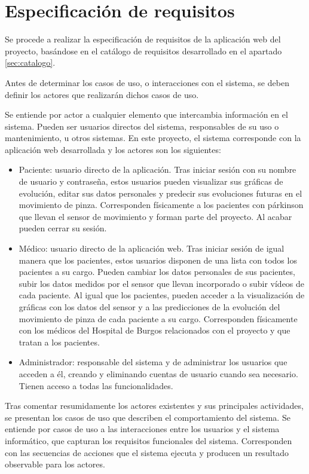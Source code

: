 \section{Especificación de requisitos}
Se procede a realizar la especificación de requisitos de la aplicación web del proyecto, basándose en el catálogo de requisitos desarrollado en el apartado \ref{sec:catalogo}.

Antes de determinar los casos de uso, o interacciones con el sistema, se deben definir los actores que realizarán dichos casos de uso.

Se entiende por actor a cualquier elemento que intercambia información en el sistema. Pueden ser usuarios directos del sistema, responsables de su uso o mantenimiento, u otros sistemas. 
En este proyecto, el sistema corresponde con la aplicación web desarrollada y los actores son los siguientes:
\begin{itemize}
    \item Paciente: usuario directo de la aplicación. Tras iniciar sesión con su nombre de usuario y contraseña, estos usuarios pueden visualizar sus gráficas de evolución, editar sus datos personales y predecir sus evoluciones futuras en el movimiento de pinza. Corresponden físicamente a los pacientes con párkinson que llevan el sensor de movimiento y forman parte del proyecto. Al acabar pueden cerrar su sesión.
    \item Médico: usuario directo de la aplicación web. Tras iniciar sesión de igual manera que los pacientes, estos usuarios disponen de una lista con todos los pacientes a su cargo. Pueden cambiar los datos personales de sus pacientes, subir los datos medidos por el sensor que llevan incorporado o subir vídeos de cada paciente. Al igual que los pacientes, pueden acceder a la visualización de gráficas con los datos del sensor y a las predicciones de la evolución del movimiento de pinza de cada paciente a su cargo. Corresponden físicamente con los médicos del Hospital de Burgos relacionados con el proyecto y que tratan a los pacientes.
    \item Administrador: responsable del sistema y de administrar los usuarios que acceden a él, creando y eliminando cuentas de usuario cuando sea necesario. Tienen acceso a todas las funcionalidades.
\end{itemize}

Tras comentar resumidamente los actores existentes y sus principales actividades, se presentan los casos de uso que describen el comportamiento del sistema. Se entiende por casos de uso a las interacciones entre los usuarios y el sistema informático, que capturan los requisitos funcionales del sistema. Corresponden con las secuencias de acciones que el sistema ejecuta y producen un resultado observable para los actores.

